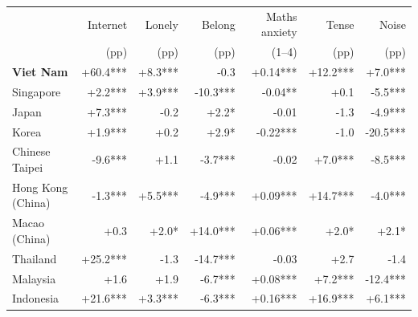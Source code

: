 \begin{tabular}{@{}lrrrrrr@{}}
\toprule
 & Internet & Lonely & Belong & Maths anxiety & Tense & Noise \\
 & (pp) & (pp) & (pp) & (1--4) & (pp) & (pp) \\
\midrule
\textbf{Viet Nam} & +60.4*** & +8.3*** & -0.3 & +0.14*** & +12.2*** & +7.0*** \\
Singapore & +2.2*** & +3.9*** & -10.3*** & -0.04** & +0.1 & -5.5*** \\
Japan & +7.3*** & -0.2 & +2.2* & -0.01 & -1.3 & -4.9*** \\
Korea & +1.9*** & +0.2 & +2.9* & -0.22*** & -1.0 & -20.5*** \\
Chinese Taipei & -9.6*** & +1.1 & -3.7*** & -0.02 & +7.0*** & -8.5*** \\
Hong Kong (China) & -1.3*** & +5.5*** & -4.9*** & +0.09*** & +14.7*** & -4.0*** \\
Macao (China) & +0.3 & +2.0* & +14.0*** & +0.06*** & +2.0* & +2.1* \\
Thailand & +25.2*** & -1.3 & -14.7*** & -0.03 & +2.7 & -1.4 \\
Malaysia & +1.6 & +1.9 & -6.7*** & +0.08*** & +7.2*** & -12.4*** \\
Indonesia & +21.6*** & +3.3*** & -6.3*** & +0.16*** & +16.9*** & +6.1*** \\
\bottomrule
\end{tabular}
